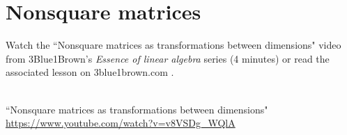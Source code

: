\section{Nonsquare matrices}

Watch the ``Nonsquare matrices as transformations between dimensions" video from
3Blue1Brown's \textit{Essence of linear algebra} series (4 minutes) or read the
associated lesson on 3blue1brown.com
\cite{bib:3b1b_linalg_nonsquare_matrices_as_transformations_between_dimensions}.
\begin{bookfigure}
   \\
  \tiny
  ``Nonsquare matrices as transformations between dimensions" \\
  \url{https://www.youtube.com/watch?v=v8VSDg_WQlA}
\end{bookfigure}
